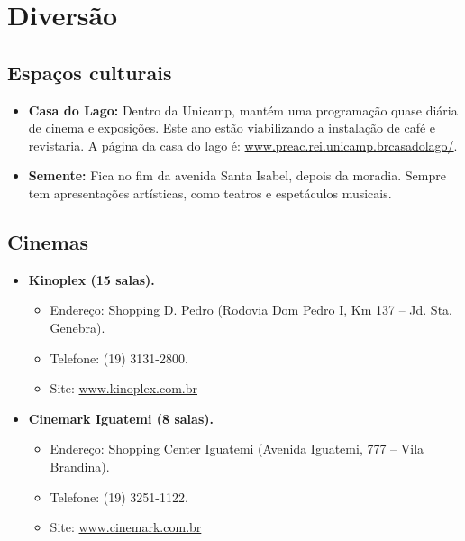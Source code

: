 
\section{Diversão}
\subsection{Espaços culturais}


\begin{itemize}
\item  \textbf{Casa do Lago:} Dentro da Unicamp, mantém uma programação quase diária de cinema e exposições. Este ano estão viabilizando a instalação de café e revistaria. A página da casa do lago é: \url{www.preac.rei.unicamp.brcasadolago/}.
\end{itemize}

\begin{itemize}
\item  \textbf{Semente:} Fica no fim da avenida Santa Isabel, depois da moradia. Sempre tem apresentações artísticas, como teatros e espetáculos musicais.
\end{itemize}

\subsection{Cinemas}

\begin{itemize}
\item  \textbf{Kinoplex (15 salas).}
\begin{itemize}
\item  Endereço: Shopping D. Pedro (Rodovia Dom Pedro I, Km 137 -- Jd. Sta. Genebra).
\item  Telefone: (19) 3131-2800.
\item  Site: \url{www.kinoplex.com.br}
\end{itemize}
\end{itemize}

\begin{itemize}
\item  \textbf{Cinemark Iguatemi (8 salas).}
\begin{itemize}
\item  Endereço: Shopping Center Iguatemi (Avenida Iguatemi, 777 -- Vila Brandina).
\item  Telefone: (19) 3251-1122.
\item  Site: \url{www.cinemark.com.br}
\end{itemize}
\end{itemize}

